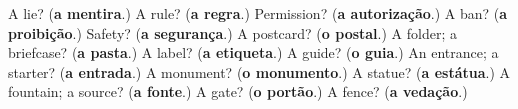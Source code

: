 \begin{tcolorbox}[breakable,colback=teal!4,colframe=teal!35!black,title={Before you move on}]
A lie? (\textbf{a mentira}.) A rule? (\textbf{a regra}.) Permission? (\textbf{a autorização}.) A ban? (\textbf{a proibição}.) Safety? (\textbf{a segurança}.) A postcard? (\textbf{o postal}.) A folder; a briefcase? (\textbf{a pasta}.) A label? (\textbf{a etiqueta}.) A guide? (\textbf{o guia}.) An entrance; a starter? (\textbf{a entrada}.) A monument? (\textbf{o monumento}.) A statue? (\textbf{a estátua}.) A fountain; a source? (\textbf{a fonte}.) A gate? (\textbf{o portão}.) A fence? (\textbf{a vedação}.)
\end{tcolorbox}
